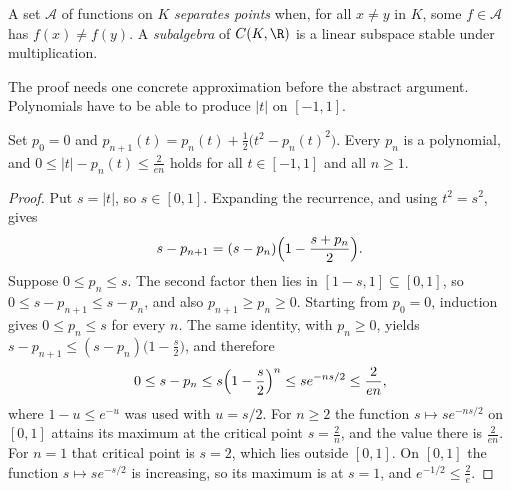 \begin{definition}
A set $\mathcal A$ of functions on $K$ \emph{separates points} when, for all $x\ne y$ in $K$, some $f\in\mathcal A$ has $f(x)\ne f(y)$. A \emph{subalgebra} of $C(K,\R)$ is a linear subspace stable under multiplication.
\end{definition}

The proof needs one concrete approximation before the abstract argument. Polynomials have to be able to produce $|t|$ on $[-1,1]$.

\begin{lemma}\label{lem:abs}
Set $p_0=0$ and $p_{n+1}(t)=p_n(t)+\frac12\bigl(t^2-p_n(t)^2\bigr)$. Every $p_n$ is a polynomial, and $0\le|t|-p_n(t)\le\frac2{en}$ holds for all $t\in[-1,1]$ and all $n\ge1$.
\end{lemma}
\begin{proof}
Put $s=|t|$, so $s\in[0,1]$. Expanding the recurrence, and using $t^2=s^2$, gives
\[s-p_{n+1}=(s-p_n)\Bigl(1-\frac{s+p_n}2\Bigr).\]
Suppose $0\le p_n\le s$. The second factor then lies in $[1-s,1]\subseteq[0,1]$, so $0\le s-p_{n+1}\le s-p_n$, and also $p_{n+1}\ge p_n\ge0$. Starting from $p_0=0$, induction gives $0\le p_n\le s$ for every $n$. The same identity, with $p_n\ge0$, yields $s-p_{n+1}\le(s-p_n)\bigl(1-\frac s2\bigr)$, and therefore
\[0\le s-p_n\le s\Bigl(1-\frac s2\Bigr)^n\le se^{-ns/2}\le\frac2{en},\]
where $1-u\le e^{-u}$ was used with $u=s/2$. For $n\ge2$ the function $s\mapsto se^{-ns/2}$ on $[0,1]$ attains its maximum at the critical point $s=\frac2n$, and the value there is $\frac2{en}$. For $n=1$ that critical point is $s=2$, which lies outside $[0,1]$. On $[0,1]$ the function $s\mapsto se^{-s/2}$ is increasing, so its maximum is at $s=1$, and $e^{-1/2}\le\frac2e$.
\end{proof}

